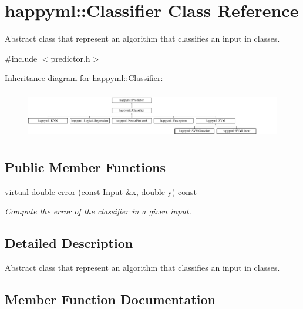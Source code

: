 \hypertarget{classhappyml_1_1Classifier}{}\section{happyml\+:\+:Classifier Class Reference}
\label{classhappyml_1_1Classifier}


Abstract class that represent an algorithm that classifies an input in classes.  




{\ttfamily \#include $<$predictor.\+h$>$}

Inheritance diagram for happyml\+:\+:Classifier\+:\begin{figure}[H]
\begin{center}
\leavevmode
\includegraphics[height=2.085661cm]{classhappyml_1_1Classifier}
\end{center}
\end{figure}
\subsection*{Public Member Functions}
\begin{DoxyCompactItemize}
\item 
virtual double \hyperlink{classhappyml_1_1Classifier_ac72f1b0b689aaff5078978ae198318df}{error} (const \hyperlink{namespacehappyml_a03602d1ec49393790b8a0449f40cd01f}{Input} \&x, double y) const 
\begin{DoxyCompactList}\small\item\em Compute the error of the classifier in a given input. \end{DoxyCompactList}\end{DoxyCompactItemize}


\subsection{Detailed Description}
Abstract class that represent an algorithm that classifies an input in classes. 

\subsection{Member Function Documentation}
